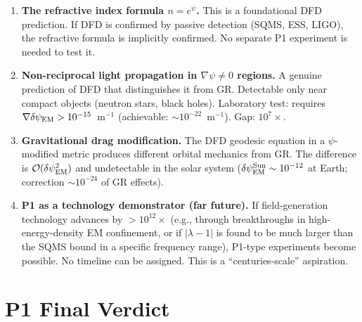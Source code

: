 \documentclass[11pt]{article}
\newcommand{\lam}{\lambda}
\newcommand{\order}[1]{\mathcal{O}(#1)}
\newcommand{\lbone}{|\lam - 1|}
\newcommand{\dpsiEM}{\delta\psi_{\rm EM}}
\theoremstyle{definition}
\theoremstyle{remark}
\begin{document}
\begin{tcolorbox}[colback=yellow!5!white, colframe=yellow!60!black,
  title=\textbf{P1: Theoretical Predictions (No Near-Term Test)}]

\begin{enumerate}[label=\textbf{T\arabic*.}, itemsep=4pt]

\item \textbf{The refractive index formula $n = e^\psi$.}
  This is a foundational DFD prediction. If DFD is confirmed by
  passive detection (SQMS, ESS, LIGO), the refractive formula is
  implicitly confirmed. No separate P1 experiment is needed to
  test it.

\item \textbf{Non-reciprocal light propagation in $\nabla\psi \neq 0$
  regions.}
  A genuine prediction of DFD that distinguishes it from GR.
  Detectable only near compact objects (neutron stars, black holes).
  Laboratory test: requires $\nabla\dpsiEM > 10^{-15}$~m$^{-1}$
  (achievable: $\sim 10^{-22}$~m$^{-1}$). Gap: $10^{7}\times$.

\item \textbf{Gravitational drag modification.}
  The DFD geodesic equation in a $\psi$-modified metric produces
  different orbital mechanics from GR. The difference is
  $\order{\dpsiEM^2}$ and undetectable in the solar system
  ($\dpsiEM^{\rm Sun} \sim 10^{-12}$ at Earth; correction
  $\sim 10^{-24}$ of GR effects).

\item \textbf{P1 as a technology demonstrator (far future).}
  If field-generation technology advances by $>10^{12}\times$
  (e.g., through breakthroughs in high-energy-density EM confinement,
  or if $\lbone$ is found to be much larger than the SQMS bound in
  a specific frequency range), P1-type experiments become possible.
  No timeline can be assigned. This is a ``centuries-scale''
  aspiration.
\end{enumerate}
\end{tcolorbox}

\section{P1 Final Verdict}
\label{sec:P1_verdict}
\end{document}
